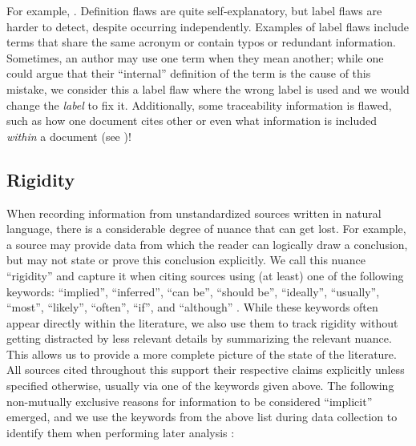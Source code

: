 \label{label-flaw-def}
For example, . Definition flaws are quite self-explanatory, but
label flaws are harder to detect, despite occurring independently. Examples of
label flaws include terms that share the same acronym or contain typos or
redundant information. Sometimes, an author may use one term when they mean
another; while one could argue that their ``internal'' definition of the term
is the cause of this mistake, we consider this a label flaw where the wrong
label is used and we would change the \emph{label} to fix it.
\label{trace-flaw-def}%
Additionally, some traceability information is flawed, such as how one document
cites other or even what information is included \emph{within} a document
(see )!

\subsection{Rigidity}\label{rigidity}

\def\impKeywordsCode{\seeSrcCode{82167b7}{scripts/helpers.py}{21}{49}}

When recording information from unstandardized sources written in natural
language, there is a considerable degree of nuance that can get lost. For
example, a source may provide data from which the reader can logically draw a
conclusion, but may not state or prove this conclusion explicitly.
We call this nuance ``rigidity'' and capture it when citing sources using
(at least) one of the following keywords: ``implied'', ``inferred'',
``can be'', ``should be'', ``ideally'', ``usually'', ``most'', ``likely'',
``often'', ``if'', and ``although''%
. While these keywords often appear
directly within the literature, we also use them to track rigidity without
getting distracted by less relevant details by summarizing the relevant
nuance. This allows us to provide a more complete picture of the state of
the literature. All sources cited throughout this \docType{} support their
respective claims explicitly unless specified otherwise, usually via one of the
keywords given above. The following non-mutually
exclusive reasons for information to be considered ``implicit'' emerged, and we
use the keywords from the above list during data collection to identify them
when performing later analysis \impKeywordsCode{}:

